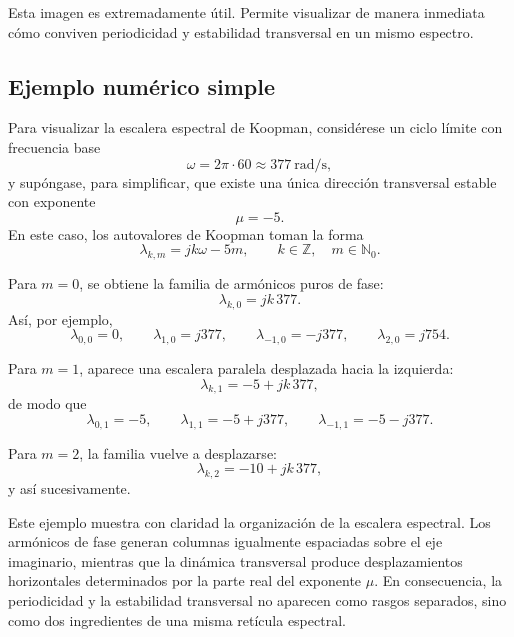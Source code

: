 Esta imagen es extremadamente útil. Permite visualizar de manera inmediata cómo conviven periodicidad y estabilidad transversal en un mismo espectro.
\subsection{Ejemplo numérico simple}

Para visualizar la escalera espectral de Koopman, considérese un ciclo límite con frecuencia base
\begin{equation}
\omega=2\pi\cdot 60 \approx 377\ \text{rad/s},
\label{eq:Koopman_ladder_numeric_omega}
\end{equation}
y supóngase, para simplificar, que existe una única dirección transversal estable con exponente
\begin{equation}
\mu=-5.
\label{eq:Koopman_ladder_numeric_mu}
\end{equation}
En este caso, los autovalores de Koopman toman la forma
\begin{equation}
\lambda_{k,m}=jk\omega-5m,
\qquad
k\in\mathbb{Z},\quad m\in\mathbb{N}_0.
\label{eq:Koopman_ladder_numeric_family}
\end{equation}

Para \(m=0\), se obtiene la familia de armónicos puros de fase:
\begin{equation}
\lambda_{k,0}=jk\,377.
\label{eq:Koopman_ladder_numeric_m0}
\end{equation}
Así, por ejemplo,
\[
\lambda_{0,0}=0,\qquad
\lambda_{1,0}=j377,\qquad
\lambda_{-1,0}=-j377,\qquad
\lambda_{2,0}=j754.
\]

Para \(m=1\), aparece una escalera paralela desplazada hacia la izquierda:
\begin{equation}
\lambda_{k,1}=-5+jk\,377,
\label{eq:Koopman_ladder_numeric_m1}
\end{equation}
de modo que
\[
\lambda_{0,1}=-5,\qquad
\lambda_{1,1}=-5+j377,\qquad
\lambda_{-1,1}=-5-j377.
\]

Para \(m=2\), la familia vuelve a desplazarse:
\begin{equation}
\lambda_{k,2}=-10+jk\,377,
\label{eq:Koopman_ladder_numeric_m2}
\end{equation}
y así sucesivamente.

Este ejemplo muestra con claridad la organización de la escalera espectral. Los armónicos de fase generan columnas igualmente espaciadas sobre el eje imaginario, mientras que la dinámica transversal produce desplazamientos horizontales determinados por la parte real del exponente \(\mu\). En consecuencia, la periodicidad y la estabilidad transversal no aparecen como rasgos separados, sino como dos ingredientes de una misma retícula espectral.

